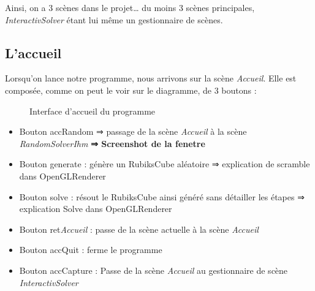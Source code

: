 Ainsi, on a 3 scènes dans le projet… du moins 3 scènes principales, \textit{InteractivSolver} étant lui même un gestionnaire de scènes.

\subsection{L'accueil}
Lorsqu’on lance notre programme, nous arrivons sur la scène \textit{Accueil}. Elle est composée, comme on peut le voir sur le diagramme, de 3 boutons :

\begin{figure}[h]
\begin{center}
\end{center}
	\caption{Interface d'accueil du programme}
\end{figure}

\begin{itemize}
    \item Bouton accRandom 
    ⇒ passage de la scène \textit{Accueil} à la scène \textit{RandomSolverIhm}
    \textbf{⇒ Screenshot de la fenetre}

    \item Bouton generate : génère un RubiksCube aléatoire
        ⇒ explication de scramble dans OpenGLRenderer

    \item Bouton solve : résout le RubiksCube ainsi généré sans détailler les étapes
        ⇒ explication Solve dans OpenGLRenderer

    \item Bouton ret\textit{Accueil} : passe de la scène actuelle à la scène \textit{Accueil}

    \item Bouton accQuit : ferme le programme

    \item Bouton accCapture : Passe de la scène \textit{Accueil} au gestionnaire de scène \textit{InteractivSolver}

\end{itemize}

